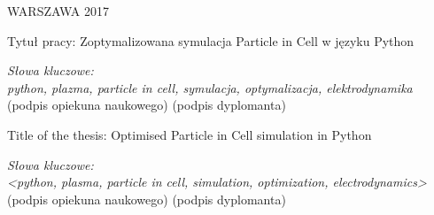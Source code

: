 \vspace{15mm}

WARSZAWA 2017 %

\newpage
\thispagestyle{empty}
\phantom{Nothing here}
\newpage
\clearpage
\phantom{Here neither}

\setcounter{page}{3}
\vspace{-1.5cm}
\begin{flushleft}
	Tytuł pracy: Zoptymalizowana symulacja Particle in Cell w języku Python %
\end{flushleft}
\vspace{0.5cm}

\vspace{0.5cm}
\noindent \textit{Słowa kluczowe: \\ python, plazma, particle in cell, symulacja, optymalizacja, elektrodynamika} %
\vfill
(podpis opiekuna naukowego) \hfill (podpis dyplomanta)

\newpage
\thispagestyle{empty}
\phantom{Nothing here}
\newpage
\clearpage
\phantom{Here neither}

\setcounter{page}{5}
\vspace{-1.5cm}
\begin{flushleft}
	Title of the thesis: Optimised Particle in Cell simulation in Python %
\end{flushleft}
\vspace{0.5cm}
\vspace{0.5cm}
\noindent \textit{Słowa kluczowe: \\ <python, plasma, particle in cell, simulation, optimization, electrodynamics>} %
\vfill
(podpis opiekuna naukowego) \hfill (podpis dyplomanta)

\newpage
\thispagestyle{empty}
\phantom{Nothing here}
\newpage
\clearpage
\phantom{Here neither}

